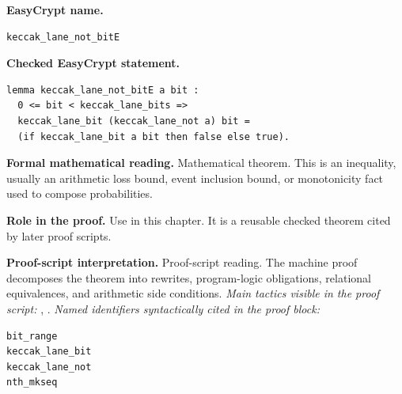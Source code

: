 \begin{formaltheorem}
\noindent\textbf{EasyCrypt name.}
\begin{lstlisting}[language=EasyCrypt,basicstyle=\ttfamily\scriptsize]
keccak_lane_not_bitE
\end{lstlisting}
\noindent\textbf{Checked EasyCrypt statement.}
\begin{lstlisting}[language=EasyCrypt,basicstyle=\ttfamily\scriptsize]
lemma keccak_lane_not_bitE a bit :
  0 <= bit < keccak_lane_bits =>
  keccak_lane_bit (keccak_lane_not a) bit =
  (if keccak_lane_bit a bit then false else true).
\end{lstlisting}
\noindent\textbf{Formal mathematical reading.}
Mathematical theorem. This is an inequality, usually an arithmetic loss bound, event inclusion bound, or monotonicity fact used to compose probabilities.

\noindent\textbf{Role in the proof.}
Use in this chapter. It is a reusable checked theorem cited by later proof scripts.

\noindent\textbf{Proof-script interpretation.}
Proof-script reading. The machine proof decomposes the theorem into rewrites, program-logic obligations, relational equivalences, and arithmetic side conditions.
\emph{Main tactics visible in the proof script:} , .
\emph{Named identifiers syntactically cited in the proof block:}
\begin{lstlisting}[language=EasyCrypt,basicstyle=\ttfamily\scriptsize]
bit_range
keccak_lane_bit
keccak_lane_not
nth_mkseq
\end{lstlisting}

\end{formaltheorem}

